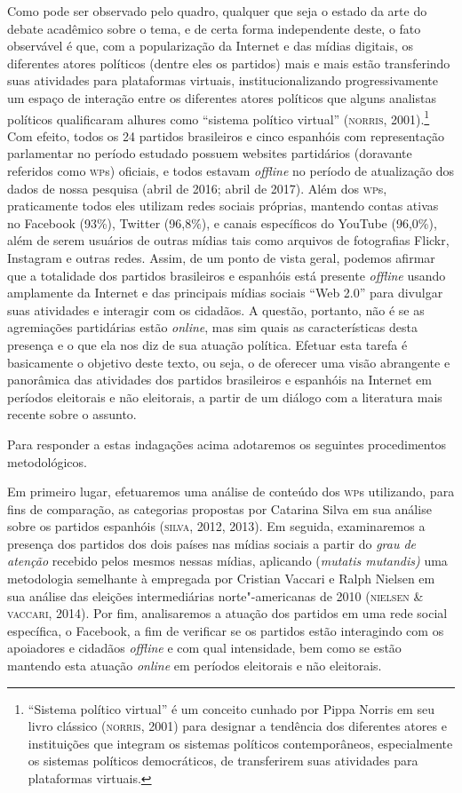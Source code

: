 Como pode ser observado pelo quadro, qualquer que seja o estado da arte
do debate acadêmico sobre o tema, e de certa forma independente deste, o
fato observável é que, com a popularização da Internet e das mídias
digitais, os diferentes atores políticos (dentre eles os partidos) mais
e mais estão transferindo suas atividades para plataformas virtuais,
institucionalizando progressivamente um espaço de interação entre os
diferentes atores políticos que alguns analistas políticos qualificaram
alhures como ``sistema político virtual'' (\textsc{norris}, 2001).\footnote{``Sistema
  político virtual'' é um conceito cunhado por Pippa Norris em seu livro
  clássico (\textsc{norris}, 2001) para designar a tendência dos diferentes
  atores e instituições que integram os sistemas políticos
  contemporâneos, especialmente os sistemas políticos democráticos, de
  transferirem suas atividades para plataformas virtuais.} Com efeito,
todos os 24 partidos brasileiros e cinco espanhóis com representação
parlamentar no período estudado possuem websites partidários (doravante
referidos como \textsc{wp}s) oficiais, e todos estavam \emph{offline} no período de
atualização dos dados de nossa pesquisa (abril de 2016; abril de 2017).
Além dos \textsc{wp}s, praticamente todos eles utilizam redes sociais próprias,
mantendo contas ativas no Facebook (93\%), Twitter (96,8\%), e canais
específicos do YouTube (96,0\%), além de serem usuários de outras mídias
tais como arquivos de fotografias Flickr, Instagram e outras redes.
Assim, de um ponto de vista geral, podemos afirmar que a totalidade dos
partidos brasileiros e espanhóis está presente \emph{offline} usando amplamente
da Internet e das principais mídias sociais ``Web 2.0'' para divulgar
suas atividades e interagir com os cidadãos. A questão, portanto, não é
se as agremiações partidárias estão \emph{\emph{online}}, mas sim quais as
características desta presença e o que ela nos diz de sua atuação
política. Efetuar esta tarefa é basicamente o objetivo deste texto, ou
seja, o de oferecer uma visão abrangente e panorâmica das atividades dos
partidos brasileiros e espanhóis na Internet em períodos eleitorais e
não eleitorais, a partir de um diálogo com a literatura mais recente
sobre o assunto.

Para responder a estas indagações acima adotaremos os seguintes
procedimentos metodológicos.

Em primeiro lugar, efetuaremos uma análise de conteúdo dos \textsc{wp}s
utilizando, para fins de comparação, as categorias propostas por
Catarina Silva em sua análise sobre os partidos espanhóis (\textsc{silva}, 2012,
2013). Em seguida, examinaremos a presença dos partidos dos dois países
nas mídias sociais a partir do \emph{grau de atenção} recebido pelos
mesmos nessas mídias, aplicando (\emph{mutatis mutandis)} uma
metodologia semelhante à empregada por Cristian Vaccari e Ralph Nielsen
em sua análise das eleições intermediárias norte"-americanas de 2010
(\textsc{nielsen} \& \textsc{vaccari}, 2014). Por fim, analisaremos a atuação dos partidos
em uma rede social específica, o Facebook, a fim de verificar se os
partidos estão interagindo com os apoiadores e cidadãos \emph{offline} e com
qual intensidade, bem como se estão mantendo esta atuação \emph{\emph{online}} em
períodos eleitorais e não eleitorais.

